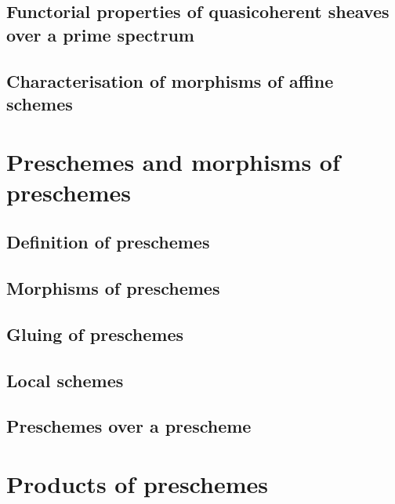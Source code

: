 \documentclass[10pt,oneside]{amsart}
\begin{document}
        \subsection{Functorial properties of quasicoherent sheaves over a prime spectrum}
        
       
        \subsection{Characterisation of morphisms of affine schemes}
        

    \section{Preschemes and morphisms of preschemes}

        \subsection{Definition of preschemes}
        

        \subsection{Morphisms of preschemes}
        

        \subsection{Gluing of preschemes}
        

        \subsection{Local schemes}
        

        \subsection{Preschemes over a prescheme}
        

    \section{Products of preschemes}
\end{document}
